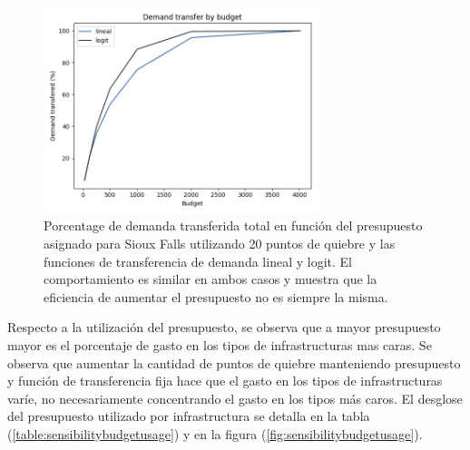 \documentclass{article}
\begin{document}
  \begin{figure}[h!]
    \centering
    \includegraphics[width=8cm]{../resources/demand_by_budget.png}
      \caption{Porcentage de demanda transferida total en función del presupuesto asignado para Sioux Falls utilizando 20 puntos de quiebre y las funciones de transferencia de demanda lineal y logit. El comportamiento es similar en ambos casos y muestra que la eficiencia de aumentar el presupuesto no es siempre la misma.}
    \label{fig:demandtransferbybudgetlinear}
  \end{figure}

  Respecto a la utilización del presupuesto, se observa que a mayor presupuesto mayor es el porcentaje de gasto en los tipos de infrastructuras mas caras. Se observa que aumentar la cantidad de puntos de quiebre manteniendo presupuesto y función de transferencia fija hace que el gasto en los tipos de infrastructuras varíe, no necesariamente concentrando el gasto en los tipos más caros. El desglose del presupuesto utilizado por infrastructura se detalla en la tabla (\ref{table:sensibilitybudgetusage}) y en la figura (\ref{fig:sensibilitybudgetusage}).
\end{document}
